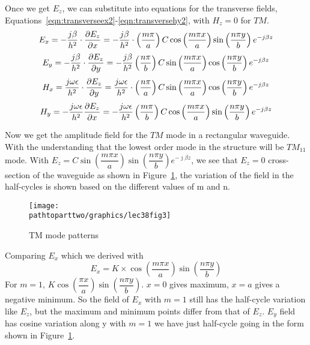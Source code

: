 Once we get $E_z$, we can substitute into equations for the transverse fields, Equations~\eqref{eqn:transverseex2}-\eqref{eqn:transversehy2}, with $H_{z} = 0$ for $TM$.
\begin{dmath*}
E_x = -\frac{j \beta}{h^2}\cdot\pdv{E_{z}}{x} = -\frac{j \beta}{h^{2}}\cdot\left(\frac{m\pi}{a}\right) C\cos \left(\frac{m\pi x}{a}\right)\sin \left(\frac{n\pi y}{b}\right)e^{-j \beta z}
\end{dmath*}
\begin{dmath*}
E_y = -\frac{j \beta}{h^2}\cdot \pdv{E_z}{y} = -\frac{j \beta}{h^{2}}\left(\frac{n\pi}{b}\right) C \sin\left(\frac{m\pi x}{a}\right)\cos \left(\frac{n\pi y}{b}\right)e^{-j \beta z}
\end{dmath*}
\begin{dmath*}
H_x = \frac{j \omega\epsilon}{h^2}\cdot\pdv{E_z}{y} = \frac{j \omega\epsilon}{h^{2}}\cdot\left(\frac{n\pi}{a}\right) C \sin \left(\frac{m\pi x}{a}\right)\cos \left(\frac{n\pi y}{b}\right)e^{-j \beta z}
\end{dmath*}
\begin{dmath*}
H_y =-\frac{j \omega\epsilon}{h^2}\pdv{E_z}{x} = -\frac{j \omega\epsilon}{h^{2}}\left(\frac{m\pi}{b}\right) C \cos \left(\frac{m\pi x}{a}\right)\sin \left(\frac{n\pi y}{b}\right)e^{-j \beta z}
\end{dmath*}

Now we get the amplitude field for the $TM$ mode in a rectangular waveguide. With the understanding that the lowest order mode in the structure will be $TM_{11}$ mode. With $E_z = C\sin\left(\dfrac{m\pi x}{a}\right)\sin\left(\dfrac{n\pi y}{b}\right)e^{-\jmath\beta z}$, we see that $E_z = 0$ cross-section of the waveguide as shown in Figure~\ref{fig:lec38fig3}, the variation of the field in the half-cycles is shown based on the different values of m and n.
\begin{figure}[h]
\centering
\texttt{[image: \\pathtoparttwo/graphics/lec38fig3]}
\caption{TM mode patterns}
\label{fig:lec38fig3}
\end{figure}
Comparing $E_x$ which we derived with 
\begin{dmath*}
E_x = K \times \cos\left(\frac{m\pi x}{a}\right)\sin\left(\frac{n\pi y}{b}\right)
\end{dmath*}
For $m=1$, $K\cos\left(\dfrac{\pi x}{a}\right)\sin\left(\dfrac{n\pi y}{b}\right)$. $x=0$ gives maximum, $x=a$ gives a negative minimum. So the field of $E_x$ with $m=1$ still has the half-cycle variation like $E_z$, but the maximum and minimum points differ from that of $E_z$. $E_y$ field has cosine variation along y with $m=1$ we have just half-cycle going in the form shown in Figure~\ref{fig:lec38fig3}.


